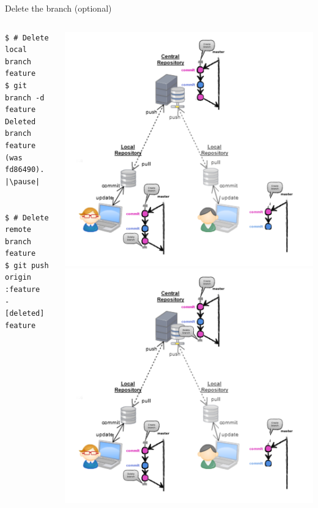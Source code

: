 \begin{frame}[fragile]{Delete the branch (optional)}
\begin{columns}
	\begin{column}{0.4\textwidth}
  	\begin{lstlisting}
$ # Delete local branch feature
$ git branch -d feature
Deleted branch feature (was fd86490). |\pause|


$ # Delete remote branch feature
$ git push origin :feature
- [deleted] feature
	\end{lstlisting}
	\end{column}
	\begin{column}{0.6\textwidth}
		\begin{center}
			 {
				\includegraphics[width=.9\textwidth]{multiuser_my_delete.png}
			}\only<2> {
				\includegraphics[width=.9\textwidth]{multiuser_remote_delete.png}
			}
		\end{center}
	\end{column}
\end{columns}
\end{frame}

